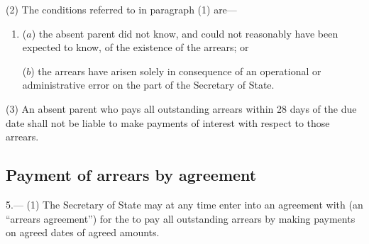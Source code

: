 \documentclass[12pt,a4paper]{article}
\begin{document}
{(2) The conditions referred to in paragraph (1) are—
\begin{enumerate}\item[]
($a$) the absent parent did not know, and could not reasonably have been expected to know, of the existence of the arrears; or

($b$) the arrears have arisen solely in consequence of an operational or administrative error on the part of the Secretary of State. 
\end{enumerate}

(3) An absent parent who pays all outstanding arrears 
within 28 days of the due date shall not be liable to make payments of interest with respect to those arrears.

}

\subsection[5. Payment of arrears by agreement]{Payment of arrears by agreement}

5.—%
%
(1) The Secretary of State may at any time enter into an agreement with 
(an “arrears agreement”) for the 
to pay all outstanding arrears by making payments on agreed dates of agreed amounts.
\end{document}
